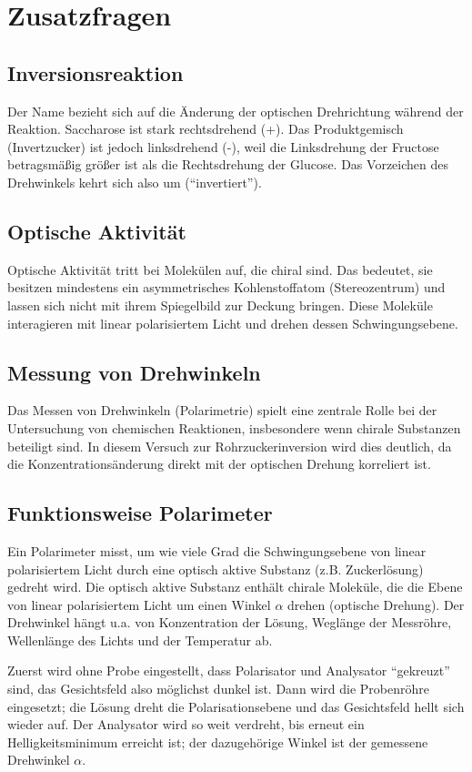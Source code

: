 \section{Zusatzfragen}
\subsection{Inversionsreaktion}
Der Name bezieht sich auf die Änderung der optischen Drehrichtung während der Reaktion.
Saccharose ist stark rechtsdrehend (+).
Das Produktgemisch (Invertzucker) ist jedoch linksdrehend (-), weil die Linksdrehung der Fructose betragsmäßig größer ist als die Rechtsdrehung der Glucose.
Das Vorzeichen des Drehwinkels kehrt sich also um (\enquote{invertiert}).

\subsection{Optische Aktivität}
Optische Aktivität tritt bei Molekülen auf, die chiral sind.
Das bedeutet, sie besitzen mindestens ein asymmetrisches Kohlenstoffatom (Stereozentrum) und lassen sich nicht mit ihrem Spiegelbild zur Deckung bringen. 
Diese Moleküle interagieren mit linear polarisiertem Licht und drehen dessen Schwingungsebene.

\subsection{Messung von Drehwinkeln}
Das Messen von Drehwinkeln (Polarimetrie) spielt eine zentrale Rolle bei der Untersuchung von chemischen Reaktionen, insbesondere wenn chirale Substanzen beteiligt sind. 
In diesem Versuch zur Rohrzuckerinversion wird dies deutlich, da die Konzentrationsänderung direkt mit der optischen Drehung korreliert ist.


\subsection{Funktionsweise Polarimeter}
Ein Polarimeter misst, um wie viele Grad die Schwingungsebene von linear polarisiertem Licht durch eine optisch aktive Substanz (z.B. Zuckerlösung) gedreht wird.
Die optisch aktive Substanz enthält chirale Moleküle, die die Ebene von linear polarisiertem Licht um einen Winkel $\alpha$ drehen (optische Drehung).
Der Drehwinkel hängt u.a. von Konzentration der Lösung, Weglänge der Messröhre, Wellenlänge des Lichts und der Temperatur ab. 

Zuerst wird ohne Probe eingestellt, dass Polarisator und Analysator \enquote{gekreuzt} sind, das Gesichtsfeld also möglichst dunkel ist.
Dann wird die Probenröhre eingesetzt; die Lösung dreht die Polarisationsebene und das Gesichtsfeld hellt sich wieder auf. 
Der Analysator wird so weit verdreht, bis erneut ein Helligkeitsminimum erreicht ist; der dazugehörige Winkel ist der gemessene Drehwinkel $\alpha$. 


